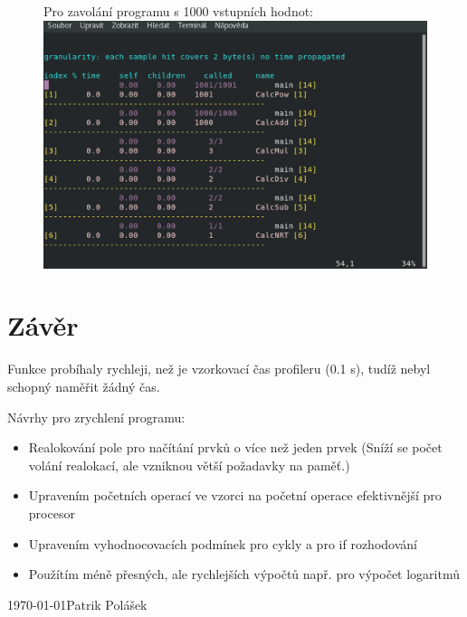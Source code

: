 \documentclass[a4paper, 11pt]{article}
\begin{document}
\begin{figure}[H]
\centering
Pro zavolání programu s 1000 vstupních hodnot:\\
\includegraphics[scale=0.5]{1000}\bigskip
\end{figure}

\section*{Závěr}
Funkce probíhaly rychleji, než je vzorkovací čas profileru (0.1 s), tudíž nebyl schopný naměřit žádný čas.\par
Návrhy pro zrychlení programu:
\begin{itemize}
\item Realokování pole pro načítání prvků o více než jeden prvek (Sníží se počet volání realokací, ale vzniknou větší požadavky na paměť.)
\item Upravením početních operací ve vzorci na početní operace efektivnější pro procesor
\item Upravením vyhodnocovacích podmínek pro cykly a pro if rozhodování
\item Použítím méně přesných, ale rychlejších výpočtů např. pro výpočet logaritmů
\end{itemize}

\vfill
\today \hfill Patrik Polášek
\end{document}
